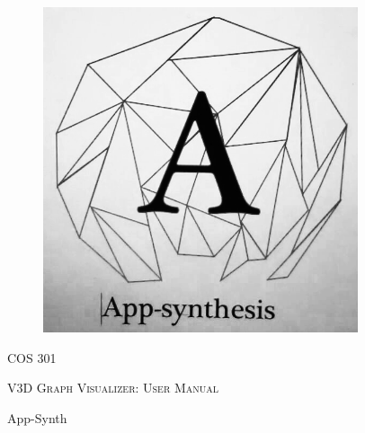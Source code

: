 \begin{titlepage}
	\begin{center}
		\begin{figure}[t]
			\centering
			\includegraphics[width=350px]{logo.PNG}
		\end{figure}
		\begin{center}
			\textsc{\LARGE COS 301}
		\end{center}
		\begin{center}		
			\textsc{\LARGE V3D Graph Visualizer: User Manual}		
		\end{center}
		
		\begin{flushright} \large
			App-Synth \newline \emph{} \newline
		\end{flushright}


	\end{center}
\end{titlepage}
